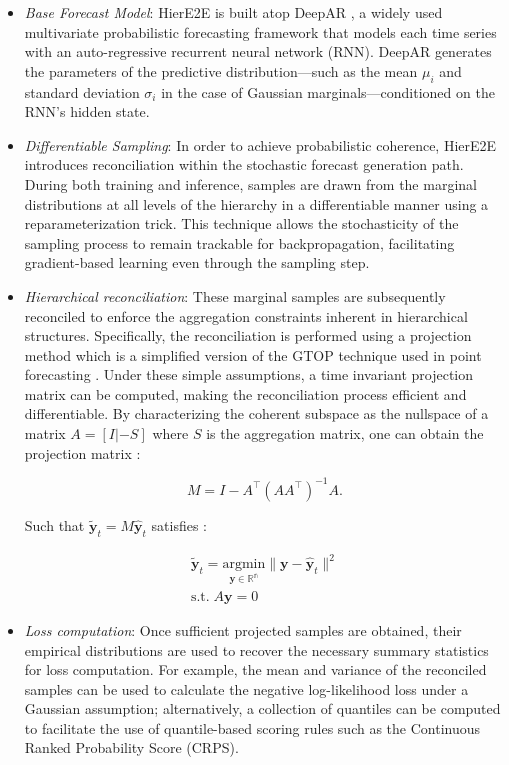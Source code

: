 \documentclass[letterpaper]{article}
\begin{document}
\begin{itemize}
     
\item \textit{Base Forecast Model}: HierE2E is built atop DeepAR \cite{DeepAR}, a widely used multivariate probabilistic forecasting framework that models each time series with an auto-regressive recurrent neural network (RNN). DeepAR generates the parameters of the predictive distribution---such as the mean $ \mu_i $ and standard deviation $\sigma_i $ in the case of Gaussian marginals---conditioned on the RNN’s hidden state.

\item \textit{Differentiable Sampling}:
In order to achieve probabilistic coherence, HierE2E introduces reconciliation within the stochastic forecast generation path. During both training and inference, samples are drawn from the marginal distributions at all levels of the hierarchy in a differentiable manner using a reparameterization trick. This technique allows the stochasticity of the sampling process to remain trackable for backpropagation, facilitating gradient-based learning even through the sampling step.

\item \textit{Hierarchical reconciliation}: These marginal samples are subsequently reconciled to enforce the aggregation constraints inherent in hierarchical structures. Specifically, the reconciliation is performed using a projection method which is a simplified version of the GTOP technique used in point forecasting \cite{gtop}. Under these simple assumptions, a time invariant projection matrix can be computed, making the reconciliation process efficient and differentiable. By characterizing the coherent subspace as the nullspace of a matrix $A = \left[ I | - S  \right]$ where $S$ is the aggregation matrix, one can obtain the projection matrix : 

\begin{equation}
    M = I - A^{\top}(AA^{\top})^{-1}A. 
\end{equation}

Such that $\tilde{\mathbf{y}}_t = M\hat{\mathbf{y}}_t$ satisfies :

\begin{multline}
    \tilde{\mathbf{y}}_t = \underset{\mathbf{y}\in \mathbb{R^n}}{\mathrm{argmin}} \|\mathbf{y} - \hat{\mathbf{y}}_t  \|^2 \\
    \mathrm{s.t.} \; A\mathbf{y} = 0
\end{multline}

\item \textit{Loss computation}: Once sufficient projected samples are obtained, their empirical distributions are used to recover the necessary summary statistics for loss computation. For example, the mean and variance of the reconciled samples can be used to calculate the negative log-likelihood loss under a Gaussian assumption; alternatively, a collection of quantiles can be computed to facilitate the use of quantile-based scoring rules such as the Continuous Ranked Probability Score (CRPS).

\end{itemize}
\end{document}
